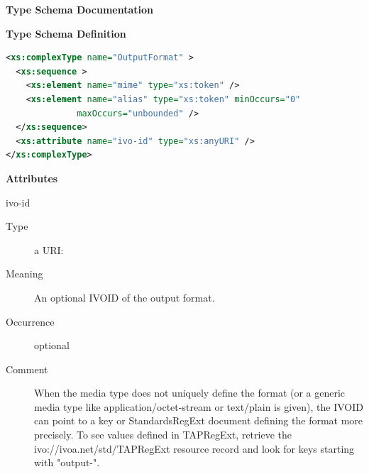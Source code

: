 \documentclass{ivoa}
\begin{document}
\begingroup
      	\renewcommand*\descriptionlabel[1]{%
      	\hbox to 5.5em{\emph{#1}\hfil}}
      	\vspace{2ex}\noindent\textbf{ Type Schema Documentation}



\vspace{1ex}\noindent\textbf{ Type Schema Definition}

\begin{lstlisting}[language=XML,basicstyle=\footnotesize]
<xs:complexType name="OutputFormat" >
  <xs:sequence >
    <xs:element name="mime" type="xs:token" />
    <xs:element name="alias" type="xs:token" minOccurs="0"
              maxOccurs="unbounded" />
  </xs:sequence>
  <xs:attribute name="ivo-id" type="xs:anyURI" />
</xs:complexType>
\end{lstlisting}

\vspace{0.5ex}\noindent\textbf{ Attributes}

\begingroup\small\begin{bigdescription}
\item[ivo-id]
\begin{description}
\item[Type] a URI: 
\item[Meaning] 
        An optional IVOID of the output format.
        
\item[Occurrence] optional
\item[Comment] 
          When the media type does not uniquely define the
          format (or a generic media type like application/octet-stream or
          text/plain is given), the IVOID can point to a key
          or StandardsRegExt document defining the format more
          precisely.  To see values defined in TAPRegExt,
          retrieve the ivo://ivoa.net/std/TAPRegExt
          resource record and look for keys starting with "output-".
        
\end{description}


\end{bigdescription}\endgroup
\end{document}
